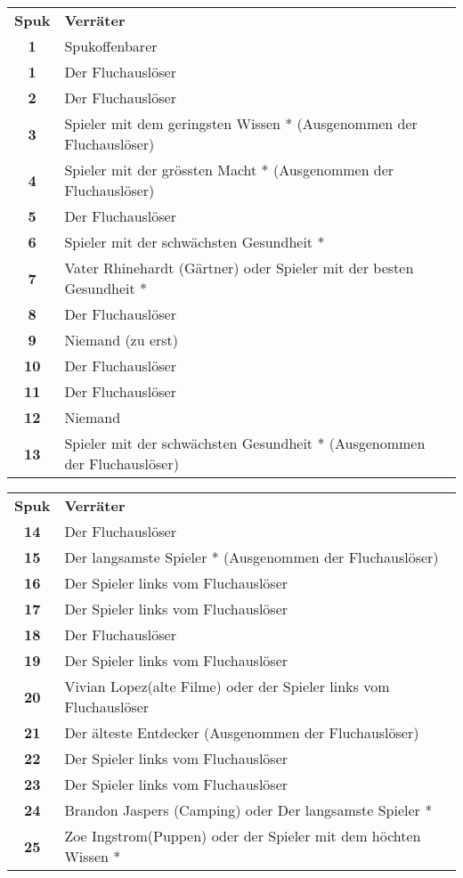 \begin{landscape}
\vspace{1cm}
\begin{multicols}{2}
\begin{tabular}{cp{11.5cm}}
\textbf{Spuk} & \textbf{Verräter} \\
\bf 1 & Spukoffenbarer \\
\bf 1  & Der Fluchauslöser \\
\bf 2  & Der Fluchauslöser \\
\bf 3  & Spieler mit dem geringsten Wissen * \newline (Ausgenommen der Fluchauslöser) \\
\bf 4  & Spieler mit der grössten Macht * \newline (Ausgenommen der Fluchauslöser) \\
\bf 5  & Der Fluchauslöser \\
\bf 6  & Spieler mit der schwächsten Gesundheit * \\
\bf 7  & Vater Rhinehardt (Gärtner) \newline oder Spieler mit der besten Gesundheit * \\
\bf 8  & Der Fluchauslöser \\
\bf 9  & Niemand (zu erst) \\
\bf 10 & Der Fluchauslöser \\
\bf 11 & Der Fluchauslöser \\
\bf 12 & Niemand \\
\bf 13 & Spieler mit der schwächsten Gesundheit * \newline (Ausgenommen der Fluchauslöser) \\
\end{tabular}
\begin{tabular}{cp{11.5cm}}
\textbf{Spuk} & \textbf{Verräter} \\
\bf 14 & Der Fluchauslöser \\
\bf 15 & Der langsamste Spieler * (Ausgenommen der Fluchauslöser) \\
\bf 16 & Der Spieler links vom Fluchauslöser \\
\bf 17 & Der Spieler links vom Fluchauslöser \\
\bf 18 & Der Fluchauslöser \\
\bf 19 & Der Spieler links vom Fluchauslöser \\
\bf 20 & Vivian Lopez(alte Filme) oder der Spieler links vom Fluchauslöser \\
\bf 21 & Der älteste Entdecker (Ausgenommen der Fluchauslöser) \\
\bf 22 & Der Spieler links vom Fluchauslöser \\
\bf 23 & Der Spieler links vom Fluchauslöser \\
\bf 24 & Brandon Jaspers (Camping) oder Der langsamste Spieler * \\
\bf 25 & Zoe Ingstrom(Puppen) oder der Spieler mit dem höchten Wissen * \\
\end{tabular}


\end{multicols}
\end{landscape}
